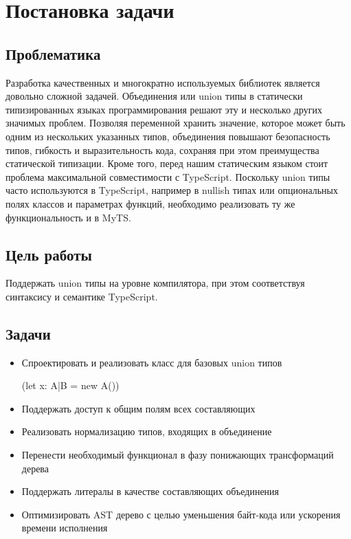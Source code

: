 \section{Постановка задачи}
\label{sec:Chapter1} 

\subsection{Проблематика}

Разработка качественных и многократно используемых библиотек является довольно сложной задачей.
Объединения или union типы в статически типизированных языках программирования решают эту и несколько других
значимых проблем.
Позволяя переменной хранить значение, которое может быть одним из нескольких указанных типов, объединения повышают
безопасность типов, гибкость и выразительность кода, сохраняя при этом преимущества статической типизации.
Кроме того, перед нашим статическим языком стоит проблема максимальной совместимости с TypeScript.
Поскольку union типы часто используются в TypeScript, например в nullish типах или опциональных полях классов и параметрах
функций, необходимо реализовать ту же функциональность и в MyTS.

\subsection{Цель работы}

Поддержать union типы на уровне компилятора, при этом соответствуя синтаксису и семантике TypeScript.

\subsection{Задачи}

\begin{itemize}[left=2em]
    \item Спроектировать и реализовать класс для базовых union типов

    (let x: A|B = new A())
    \item Поддержать доступ к общим полям всех составляющих
    \item Реализовать нормализацию типов, входящих в объединение
    \item Перенести необходимый функционал в фазу понижающих трансформаций дерева
    \item Поддержать литералы в качестве составляющих объединения
    \item Оптимизировать AST дерево с целью уменьшения байт-кода или ускорения времени исполнения
\end{itemize}

